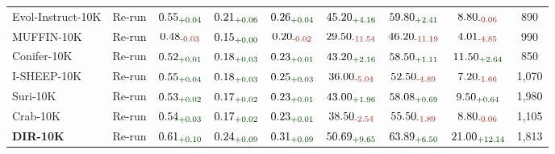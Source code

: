 \begin{table}[!t]
{\begin{tabular}{lc|ccc|cc|cc}
Evol-Instruct-10K & Re-run & $\text{0.55}_{\textcolor{deepgreen}{\text{+0.04}}}$ & $\text{0.21}_{\textcolor{deepgreen}{\text{+0.06}}}$ & $\text{0.26}_{\textcolor{deepgreen}{\text{+0.04}}}$ & $\text{45.20}_{\textcolor{deepgreen}{\text{+4.16}}}$ & $\text{59.80}_{\textcolor{deepgreen}{\text{+2.41}}}$ & $\text{8.80}_{\textcolor{deepred}{\text{-0.06}}}$ & 890 \\
MUFFIN-10K & Re-run & $\text{0.48}_{\textcolor{deepred}{\text{-0.03}}}$ & $\text{0.15}_{\textcolor{deepgreen}{\text{+0.00}}}$ & $\text{0.20}_{\textcolor{deepred}{\text{-0.02}}}$ & $\text{29.50}_{\textcolor{deepred}{\text{-11.54}}}$ & $\text{46.20}_{\textcolor{deepred}{\text{-11.19}}}$ & $\text{4.01}_{\textcolor{deepred}{\text{-4.85}}}$ & 990 \\
Conifer-10K & Re-run & $\text{0.52}_{\textcolor{deepgreen}{\text{+0.01}}}$ & $\text{0.18}_{\textcolor{deepgreen}{\text{+0.03}}}$ & $\text{0.23}_{\textcolor{deepgreen}{\text{+0.01}}}$ & $\text{43.20}_{\textcolor{deepgreen}{\text{+2.16}}}$ & $\text{58.50}_{\textcolor{deepgreen}{\text{+1.11}}}$ & $\text{11.50}_{\textcolor{deepgreen}{\text{+2.64}}}$ & 850 \\
I-SHEEP-10K & Re-run & $\text{0.55}_{\textcolor{deepgreen}{\text{+0.04}}}$ & $\text{0.18}_{\textcolor{deepgreen}{\text{+0.03}}}$ & $\text{0.25}_{\textcolor{deepgreen}{\text{+0.03}}}$ & $\text{36.00}_{\textcolor{deepred}{\text{-5.04}}}$ & $\text{52.50}_{\textcolor{deepred}{\text{-4.89}}}$ & $\text{7.20}_{\textcolor{deepred}{\text{-1.66}}}$ & 1,070 \\
Suri-10K & Re-run & $\text{0.53}_{\textcolor{deepgreen}{\text{+0.02}}}$ & $\text{0.17}_{\textcolor{deepgreen}{\text{+0.02}}}$ & $\text{0.23}_{\textcolor{deepgreen}{\text{+0.01}}}$ & $\text{43.00}_{\textcolor{deepgreen}{\text{+1.96}}}$ & $\text{58.08}_{\textcolor{deepgreen}{\text{+0.69}}}$ & $\text{9.50}_{\textcolor{deepgreen}{\text{+0.64}}}$ & 1,980 \\
Crab-10K & Re-run & $\text{0.54}_{\textcolor{deepgreen}{\text{+0.03}}}$ & $\text{0.17}_{\textcolor{deepgreen}{\text{+0.02}}}$ & $\text{0.23}_{\textcolor{deepgreen}{\text{+0.01}}}$ & $\text{38.50}_{\textcolor{deepred}{\text{-2.54}}}$ & $\text{55.50}_{\textcolor{deepred}{\text{-1.89}}}$ & $\text{8.80}_{\textcolor{deepred}{\text{-0.06}}}$ & 1,105 \\
\textbf{DIR-10K} & Re-run & \textbf{$\text{0.61}_{\textcolor{deepgreen}{\text{+0.10}}}$} & \textbf{$\text{0.24}_{\textcolor{deepgreen}{\text{+0.09}}}$} & \textbf{$\text{0.31}_{\textcolor{deepgreen}{\text{+0.09}}}$} & \textbf{$\text{50.69}_{\textcolor{deepgreen}{\text{+9.65}}}$} & \textbf{$\text{63.89}_{\textcolor{deepgreen}{\text{+6.50}}}$} & \textbf{$\text{21.00}_{\textcolor{deepgreen}{\text{+12.14}}}$} & 1,813 \\
\bottomrule
\end{tabular}}
\label{table:controlled_comparison}
\end{table}

